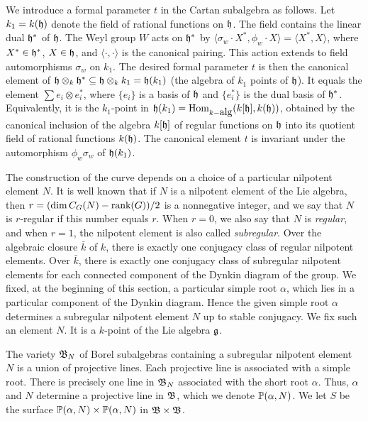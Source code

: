 We introduce a formal parameter $t$ in the Cartan subalgebra as follows.
Let $k_1=k(\h)$ denote the field of rational functions on $\h$.  
The field contains the linear dual $\h^*$ of $\h$.
The Weyl group $W$ acts on $\h^*$ by $\langle\sigma_w\cdot X^*,\phi_w\cdot X\rangle
=\langle X^*,X\rangle$, where $X^*\in\h^*$, $X\in\h$, and $\langle\cdot,\cdot
\rangle$ is the canonical pairing.  This action extends to field
automorphisms $\sigma_w$ on $k_1$.  The desired formal parameter $t$
is then the canonical element of $\h\otimes_k\h^* \subseteq \h\otimes_k k_1
= \h(k_1)$
(the algebra of $k_1$ points of $\h$).  It equals
the element $\sum e_i\otimes e_i^*$, where $\{e_i\}$ is a basis of $\h$
and $\{e_i^*\}$ is the dual basis of $\h^*$.  Equivalently, it is
the $k_1$-point in $\h(k_1) = \hbox{Hom}_{k-\hbox{alg}}(k[\h],k(\h))$,
obtained by the canonical inclusion of the algebra $k[\h]$ of regular
functions on $\h$ into its quotient field of rational functions $k(\h)$.
The canonical element $t$ is invariant under the automorphism
$\phi_w\sigma_w$ of $\h(k_1)$.

The construction of the curve depends on a choice of a particular
nilpotent element $N$.  It is well known that if $N$ is a nilpotent
element of the Lie algebra, then 
$r=(\dim C_G(N) - \hbox{rank}(G))/2$ is a nonnegative integer, and we say that
$N$ is $r$-regular if this number equals $r$.  When $r=0$, we also
say that $N$ is {\it regular}, and
when $r=1$, the nilpotent element is also
called {\it subregular}.  
Over the algebraic closure $\bar k$ of $k$, there
is exactly one conjugacy class of regular nilpotent elements.  
Over $\bar k$, 
there is exactly one conjugacy class of subregular nilpotent
elements for each connected component of the Dynkin diagram of the
group.  We fixed, at the beginning of this section, a particular
simple root $\alpha$, which lies in
a particular component of the Dynkin diagram.  Hence the
given simple root $\alpha$ determines a subregular nilpotent element $N$ up to
stable
conjugacy.  We fix such an element $N$.  It is a $k$-point of the
Lie algebra $\g$.

The variety $\B_N$ of Borel subalgebras containing a subregular nilpotent element
$N$ is a union of projective lines.  Each projective line is associated
with a simple root.  There is precisely one line in $\B_N$ associated
with the short root $\alpha$.  Thus, $\alpha$ and $N$ determine a
projective line in $\B$, which we denote $\P(\alpha,N)$.
We let $S$
be the surface $\P(\alpha,N)\times \P(\alpha,N)$
in $\B\times \B$.

